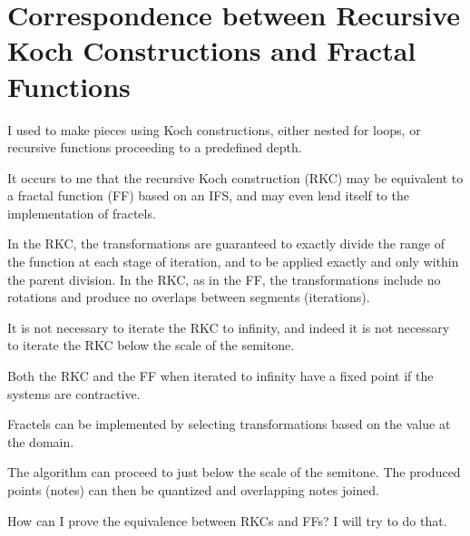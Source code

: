 \documentclass[english,11pt,letterpaper,onecolumn]{scrartcl}
\numberwithin{equation}{section}
\begin{document}
\section{Correspondence between Recursive Koch Constructions and Fractal Functions}

I used to make pieces using Koch constructions, either nested for loops, or recursive
functions proceeding to a predefined depth.

It occurs to me that the recursive Koch construction (RKC) may be equivalent to a
fractal function (FF) based on an IFS, and may even lend itself to the implementation
of fractels.

In the RKC, the transformations are guaranteed to exactly divide the range of the
function at each stage of iteration, and to be applied exactly and only within the
parent division. In the RKC, as in the FF, the transformations include no rotations and
produce no overlaps between segments (iterations).

It is not necessary to iterate the RKC to infinity, and indeed it is not necessary to
iterate the RKC below the scale of the semitone.

Both the RKC and the FF when iterated to infinity have a fixed point if the systems are
contractive.

Fractels can be implemented by selecting transformations based on the value at the domain.

The algorithm can proceed to just below the scale of the semitone. The produced points
(notes) can then be quantized and overlapping notes joined.

How can I prove the equivalence between RKCs and FFs? I will try to do that.

\printbibliography
\end{document}

